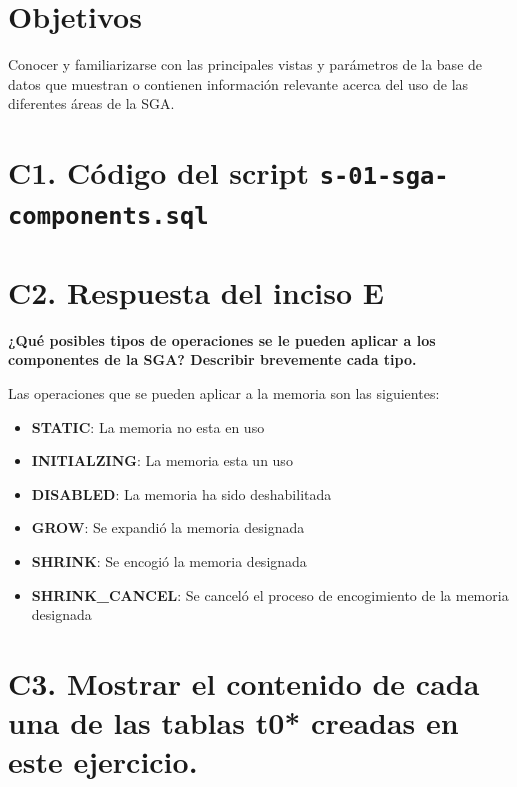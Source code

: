 \documentclass{article}
\begin{document}
\section*{Objetivos}
Conocer y familiarizarse con las principales vistas y parámetros de la base de 
datos que muestran o contienen información relevante acerca del uso
de las diferentes áreas de la SGA.

\section*{C1. Código del script \texttt{s-01-sga-components.sql}}



\section*{C2. Respuesta del inciso E}
\textbf{¿Qué posibles tipos de operaciones se le pueden aplicar 
  a los componentes de la SGA? Describir brevemente cada tipo.}

Las operaciones que se pueden aplicar a la memoria son las siguientes:
\begin{itemize}
    \item \textbf{STATIC}: La memoria no esta en uso
    \item \textbf{INITIALZING}: La memoria esta un uso
    \item \textbf{DISABLED}: La memoria ha sido deshabilitada
    \item \textbf{GROW}: Se expandió la memoria designada
    \item \textbf{SHRINK}: Se encogió la memoria designada
    \item \textbf{SHRINK\_CANCEL}: Se canceló el proceso de encogimiento de la
    memoria designada
\end{itemize}

\section*{C3. Mostrar el contenido de cada una de las tablas t0* creadas en 
este ejercicio.}
\end{document}
